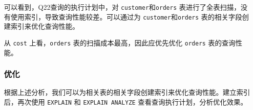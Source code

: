\documentclass{article}
\renewcommand\tt{\texttt}
\begin{document}
\begin{enumerate}
可以看到，Q22查询的执行计划中，对 \tt{customer}和\tt{orders} 表进行了全表扫描，没有使用索引，导致查询性能较差。可以通过为 \tt{customer}和\tt{orders} 表的相关字段创建索引来优化查询性能。

从 \tt{cost} 上看，\tt{orders} 表的扫描成本最高，因此应优先优化 \tt{orders} 表的查询性能。

\end{enumerate}

\subsubsection{优化}

根据上述分析，我们可以为相关表的相关字段创建索引来优化查询性能。建立索引后，再次使用 \tt{EXPLAIN} 和 \tt{EXPLAIN ANALYZE} 查看查询执行计划，分析优化效果。
\end{document}
